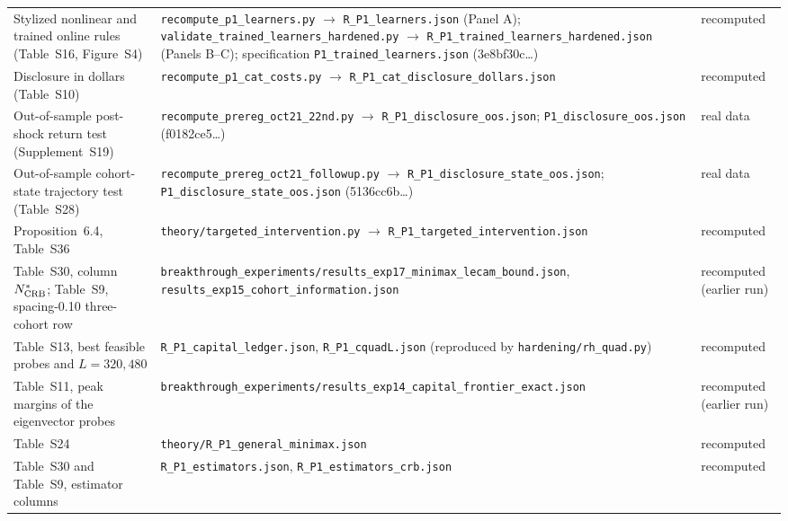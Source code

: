 \documentclass[12pt]{article}
\theoremstyle{definition}
\theoremstyle{remark}
\begin{document}
\begin{longtable}{p{}p{}p{}}
Stylized nonlinear and trained online rules (Table~S16, Figure~S4) & \texttt{recompute\_\allowbreak p1\_\allowbreak learners.py} $\to$ \texttt{R\_P1\_\allowbreak learners.json} (Panel A); \texttt{validate\_\allowbreak trained\_\allowbreak learners\_\allowbreak hardened.py} $\to$ \texttt{R\_P1\_\allowbreak trained\_\allowbreak learners\_\allowbreak hardened.json} (Panels B--C); specification \texttt{P1\_\allowbreak trained\_\allowbreak learners.json} (3e8bf30c\ldots) & recomputed\\
Disclosure in dollars (Table~S10) & \texttt{recompute\_\allowbreak p1\_\allowbreak cat\_\allowbreak costs.py} $\to$ \texttt{R\_P1\_\allowbreak cat\_\allowbreak disclosure\_\allowbreak dollars.json} & recomputed\\
Out-of-sample post-shock return test (Supplement~S19) & \texttt{recompute\_\allowbreak prereg\_\allowbreak oct21\_\allowbreak 22nd.py} $\to$ \texttt{R\_P1\_\allowbreak disclosure\_\allowbreak oos.json}; \texttt{P1\_\allowbreak disclosure\_\allowbreak oos.json} (f0182ce5\ldots) & real data\\
Out-of-sample cohort-state trajectory test (Table~S28) & \texttt{recompute\_\allowbreak prereg\_\allowbreak oct21\_\allowbreak followup.py} $\to$ \texttt{R\_P1\_\allowbreak disclosure\_\allowbreak state\_\allowbreak oos.json}; \texttt{P1\_\allowbreak disclosure\_\allowbreak state\_\allowbreak oos.json} (5136cc6b\ldots) & real data\\
\bottomrule
Proposition~6.4, Table~S36 & \texttt{theory/targeted\_intervention.py} $\to$ \texttt{R\_P1\_targeted\_intervention.json} & recomputed\\
Table~S30, column $N^*_{\rm CRB}$; Table~S9, spacing-0.10 three-cohort row & \texttt{breakthrough\_experiments/results\_exp17\_minimax\_lecam\_bound.json}, \texttt{results\_exp15\_cohort\_information.json} & recomputed (earlier run)\\
Table~S13, best feasible probes and $L=320,480$ & \texttt{R\_P1\_capital\_ledger.json}, \texttt{R\_P1\_cquadL.json} (reproduced by \texttt{hardening/rh\_quad.py}) & recomputed\\
Table~S11, peak margins of the eigenvector probes & \texttt{breakthrough\_experiments/results\_exp14\_capital\_frontier\_exact.json} & recomputed (earlier run)\\
Table~S24 & \texttt{theory/R\_P1\_general\_minimax.json} & recomputed\\
Table~S30 and Table~S9, estimator columns & \texttt{R\_P1\_estimators.json}, \texttt{R\_P1\_estimators\_crb.json} & recomputed\\

\end{longtable}
\end{document}
